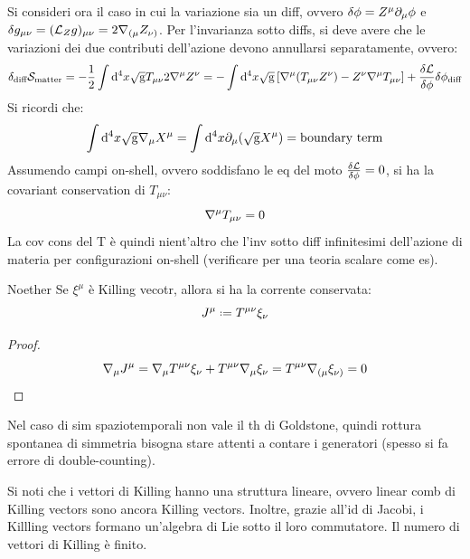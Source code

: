 Si consideri ora il caso in cui la variazione sia un diff, ovvero $ \delta \phi = Z^\mu \partial_\mu \phi $ e $ \delta g_{\mu \nu} = (\mathcal{L}_Z g)_{\mu \nu} = 2 \nabla_{(\mu} Z_{\nu)} $. Per l'invarianza sotto diffs, si deve avere che le variazioni dei due contributi dell'azione devono annullarsi separatamente, ovvero:
\begin{equation*}
  \delta_\text{diff} \mathcal{S}_\text{matter} = - \frac{1}{2} \int \mathrm{d}^4x \sqrt{\mathrm{g}} T_{\mu \nu} 2 \nabla^\mu Z^\nu = - \int \mathrm{d}^4x \sqrt{\mathrm{g}} \left[ \nabla^\mu (T_{\mu \nu} Z^\nu) - Z^\nu \nabla^\mu T_{\mu \nu} \right] + \frac{\delta \mathcal{L}}{\delta \phi} \delta \phi_\text{diff}
\end{equation*}
Si ricordi che:
\begin{equation}
  \int \mathrm{d}^4x \sqrt{\mathrm{g}} \nabla_\mu X^\mu =  \int \mathrm{d}^4x \partial_\mu(\sqrt{\mathrm{g}} X^\mu) = \text{boundary term}
\end{equation}
Assumendo campi on-shell, ovvero soddisfano le eq del moto $ \frac{\delta \mathcal{L}}{\delta \phi} = 0 $, si ha la covariant conservation di $ T_{\mu \nu} $:
\begin{equation}
  \nabla^\mu T_{\mu \nu} = 0
\end{equation}
La cov cons del T è quindi nient'altro che l'inv sotto diff infinitesimi dell'azione di materia per configurazioni on-shell (verificare per una teoria scalare come es).

\begin{theorem}{Noether}{}
  Se $ \xi^\mu $ è Killing vecotr, allora si ha la corrente conservata:
  \begin{equation}
    J^\mu \defeq T^{\mu \nu} \xi_\nu
  \end{equation}
\end{theorem}

\begin{proofbox}
  \begin{proof}
    \begin{equation*}
      \nabla_\mu J^\mu = \nabla_\mu T^{\mu \nu} \xi_\nu + T^{\mu \nu} \nabla_{\mu} \xi_\nu = T^{\mu \nu} \nabla_{(\mu} \xi_{\nu)} = 0
    \end{equation*}
  \end{proof}
\end{proofbox}

Nel caso di sim spaziotemporali non vale il th di Goldstone, quindi rottura spontanea di simmetria bisogna stare attenti a contare i generatori (spesso si fa errore di double-counting).

Si noti che i vettori di Killing hanno una struttura lineare, ovvero linear comb di Killing vectors sono ancora Killing vectors. Inoltre, grazie all'id di Jacobi, i Killling vectors formano un'algebra di Lie sotto il loro commutatore. Il numero di vettori di Killing è finito.

